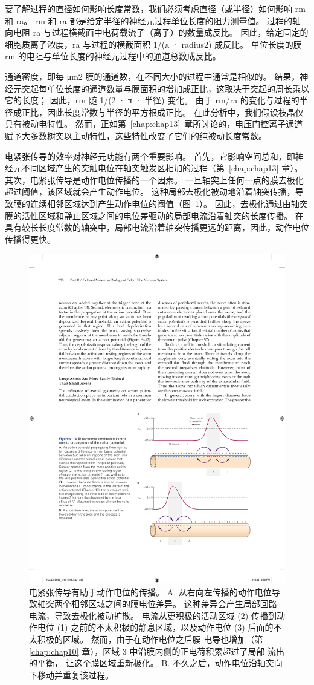 要了解过程的直径如何影响长度常数，我们必须考虑直径（或半径）如何影响 rm 和 ra。
rm 和 ra 都是给定半径的神经元过程单位长度的阻力测量值。
过程的轴向电阻 ra 与过程横截面中电荷载流子（离子）的数量成反比。 
因此，给定固定的细胞质离子浓度，ra 与过程的横截面积 1/(π · radius2) 成反比。
单位长度的膜 rm 的电阻与单位长度的神经元过程中的通道总数成反比。


通道密度，即每 μm2 膜的通道数，在不同大小的过程中通常是相似的。
结果，神经元突起每单位长度的通道数量与膜面积的增加成正比，这取决于突起的周长乘以它的长度；
因此，rm 随 1/(2 · π · 半径) 变化。
由于 rm/ra 的变化与过程的半径成正比，因此长度常数与半径的平方根成正比。
在此分析中，我们假设枝晶仅具有被动电特性。
然而，正如第~\ref{chap:chap13}~章所讨论的，电压门控离子通道赋予大多数树突以主动特性，这些特性改变了它们的纯被动长度常数。


电紧张传导的效率对神经元功能有两个重要影响。
首先，它影响空间总和，即神经元不同区域产生的突触电位在轴突触发区相加的过程（第~\ref{chap:chap13} 章）。
其次，电紧张传导是动作电位传播的一个因素。
一旦轴突上任何一点的膜去极化超过阈值，该区域就会产生动作电位。
这种局部去极化被动地沿着轴突传播，导致膜的连续相邻区域达到产生动作电位的阈值（图~\ref{fig:9_12}）。 
因此，去极化通过由轴突膜的活性区域和静止区域之间的电位差驱动的局部电流沿着轴突的长度传播。 
在具有较长长度常数的轴突中，局部电流沿着轴突传播更远的距离，因此，动作电位传播得更快。


\begin{figure}[htbp]
	\centering
	\includegraphics[width=0.7\linewidth]{chap09/fig_9_12}
	\caption{电紧张传导有助于动作电位的传播。 A. 从右向左传播的动作电位导致轴突两个相邻区域之间的膜电位差异。 这种差异会产生局部回路电流，导致去极化被动扩散。 电流从更积极的活动区域 (2) 传播到动作电位 (1) 之前的不太积极的静息区域，以及动作电位 (3) 后面的不太积极的区域。 然而，由于在动作电位之后膜  电导也增加（第 \ref{chap:chap10} 章），区域 3 中沿膜内侧的正电荷积累超过了局部  流出的平衡， 让这个膜区域重新极化。 B. 不久之后，动作电位沿轴突向下移动并重复该过程。}
	\label{fig:9_12}
\end{figure}



